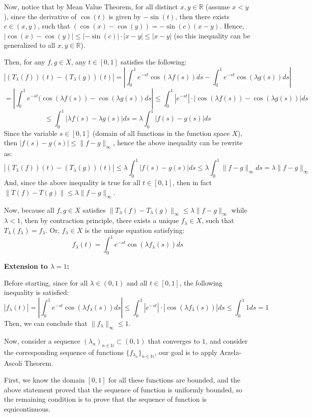 \documentclass{article}
\begin{document}
Now, notice that by Mean Value Theorem, for all distinct $x,y\in\mathbb{R}$ (assume $x<y$), since the derivative of $\cos(t)$ is given by $-\sin(t)$,
then there exists $c\in (x,y)$, such that $(\cos(x)-\cos(y))=-\sin(c)(x-y)$. Hence, $|\cos(x)-\cos(y)|\leq |-\sin(c)|\cdot|x-y| \leq |x-y|$ (so this inequality can be generalized to all $x,y\in\mathbb{R}$).

Then, for any $f,g\in X$, any $t\in [0,1]$ satisfies the following:
$$|(T_\lambda(f))(t)-(T_\lambda(g))(t)| = \left|\int_{0}^{1}e^{-st}\cos(\lambda f(s))ds-\int_{0}^{1}e^{-st}\cos(\lambda g(s))ds\right|$$
$$ = \left|\int_{0}^{1}e^{-st}(\cos(\lambda f(s))-\cos(\lambda g(s))ds\right| \leq \int_{0}^{1}|e^{-st}|\cdot |\cos(\lambda f(s))-\cos(\lambda g(s))|ds$$
$$\leq \int_{0}^{1}|\lambda f(s)-\lambda g(s)|ds = \lambda \int_{0}^{1}|f(s)-g(s)|ds$$
Since the variable $s\in [0,1]$ (domain of all functions in the function space $X$), then $|f(s)-g(s)| \leq \|f-g\|_\infty$, hence the above inequality can be rewrite as:
$$|(T_\lambda(f))(t)-(T_\lambda(g))(t)| \leq \lambda\int_{0}^{1}|f(s)-g(s)|ds \leq \lambda\int_{0}^{1}\|f-g\|_\infty ds = \lambda\|f-g\|_\infty$$
And, since the above inequality is true for all $t\in [0,1]$, then in fact $\|T(f)-T(g)\| \leq \lambda \|f-g\|_\infty$.

Now, because all $f,g\in X$ satisfies $\|T_\lambda(f)-T_\lambda(g)\|_\infty \leq \lambda\|f-g\|_\infty$ while $\lambda<1$, then by contraction principle, there exists a unique $f_\lambda \in X$,
such that $T_\lambda(f_\lambda)=f_\lambda$. Or, $f_\lambda\in X$ is the unique equation satisfying:
$$f_\lambda(t)=\int_{0}^{1}e^{-st}\cos(\lambda f_\lambda(s))ds$$

\hfil

\textbf{Extension to $\lambda=1$:}

Before starting, since for all $\lambda\in (0,1)$ and all $t\in [0,1]$, the following inequality is satisfied:
$$|f_\lambda(t)| = \left|\int_{0}^{1}e^{-st}\cos(\lambda f_\lambda(s))ds\right|\leq\int_{0}^{1}|e^{-st}|\cdot |\cos(\lambda f_\lambda(s))|ds \leq \int_{0}^{1}1 ds = 1$$
Then, we can conclude that $\|f_\lambda\|_\infty \leq 1$.

\hfil

Now, consider a sequence $(\lambda_n)_{n\in\mathbb{N}}\subset (0,1)$ that converges to $1$, and consider the corresponding sequence of functions $\{f_{\lambda_n}\}_{n\in\mathbb{N}}$,
our goal is to apply Arzela-Ascoli Theorem.

First, we know the domain $[0,1]$ for all these functions are bounded, and the above statement proved that the sequence of function is uniformly bounded, so the remaining condition is to prove that the sequence of function is equicontinuous.
\end{document}
